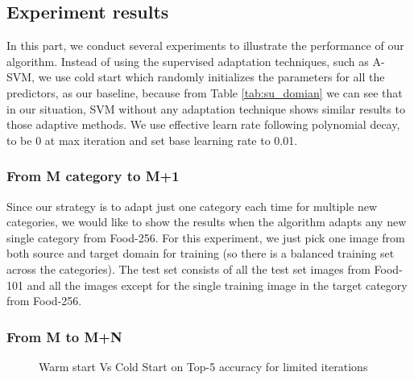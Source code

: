 \subsection{Experiment results}
In this part, we conduct several experiments to illustrate the performance of our algorithm. Instead of using the supervised adaptation techniques, such as A-SVM, we use cold start which randomly initializes the parameters for all the predictors, as our baseline, because from Table \ref{tab:su_domian} we can see that in our situation, SVM without any adaptation technique shows similar results to those adaptive methods. We use effective learn rate following polynomial decay, to be 0 at max iteration and set base learning rate to 0.01.

\subsubsection{From M category to M+1}
Since our strategy is to adapt just one category each time for multiple new categories, we would like to show the results when the algorithm adapts any new single category from Food-256. For this experiment, we just pick one image from both source and target domain for training (so there is a balanced training set across the categories). The test set consists of all the test set images from Food-101 and all the images except for the single training image in the target category from Food-256.

\subsubsection{From M to M+N}

\begin{figure}
  \centering
  \centering
\caption{Warm start Vs Cold Start on Top-5 accuracy for limited iterations}
\end{figure}
